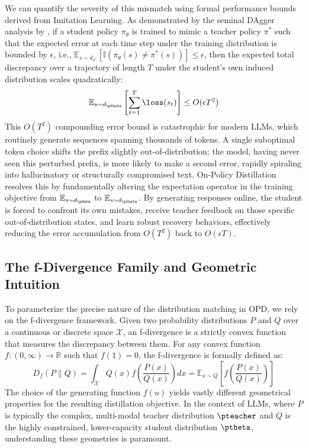 We can quantify the severity of this mismatch using formal performance bounds derived from Imitation Learning. As demonstrated by the seminal DAgger analysis by \citet{ross2011reduction}, if a student policy $\pi_\theta$ is trained to mimic a teacher policy $\pi^*$ such that the expected error at each time step under the training distribution is bounded by $\epsilon$, i.e., $\mathbb{E}_{s \sim d_{\pi^*}}[\mathbb{I}(\pi_\theta(s) \neq \pi^*(s))] \le \epsilon$, then the expected total discrepancy over a trajectory of length $T$ under the student's own induced distribution scales quadratically:
\begin{equation}
    \mathbb{E}_{s \sim d_{\ptheta}} \left[ \sum_{t=1}^T \loss(s_t) \right] \le O(\epsilon T^2)
\end{equation}
This $O(T^2)$ compounding error bound is catastrophic for modern LLMs, which routinely generate sequences spanning thousands of tokens. A single suboptimal token choice shifts the prefix slightly out-of-distribution; the model, having never seen this perturbed prefix, is more likely to make a second error, rapidly spiraling into hallucinatory or structurally compromised text. On-Policy Distillation resolves this by fundamentally altering the expectation operator in the training objective from $\mathbb{E}_{s \sim d_{\pdata}}$ to $\mathbb{E}_{s \sim d_{\ptheta}}$. By generating responses online, the student is forced to confront its own mistakes, receive teacher feedback on those specific out-of-distribution states, and learn robust recovery behaviors, effectively reducing the error accumulation from $O(T^2)$ back to $O(\epsilon T)$.

\subsection{The f-Divergence Family and Geometric Intuition}
\label{subsec:f_divergence}

To parameterize the precise nature of the distribution matching in OPD, we rely on the f-divergence framework. Given two probability distributions $P$ and $Q$ over a continuous or discrete space $\mathcal{X}$, an f-divergence is a strictly convex function that measures the discrepancy between them. For any convex function $f: (0, \infty) \to \mathbb{R}$ such that $f(1) = 0$, the f-divergence is formally defined as:
\begin{equation}
    D_f(P \parallel Q) = \int_{\mathcal{X}} Q(x) f\left(\frac{P(x)}{Q(x)}\right) dx = \mathbb{E}_{x \sim Q} \left[ f\left(\frac{P(x)}{Q(x)}\right) \right]
\end{equation}
The choice of the generating function $f(u)$ yields vastly different geometrical properties for the resulting distillation objective. In the context of LLMs, where $P$ is typically the complex, multi-modal teacher distribution $\pteacher$ and $Q$ is the highly constrained, lower-capacity student distribution $\ptheta$, understanding these geometries is paramount.

